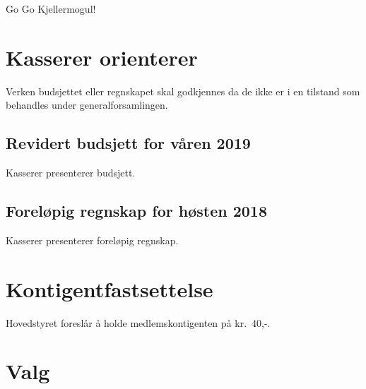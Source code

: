 \documentclass[10pt,norsk,a4paper]{article}
\begin{document}
Go Go Kjellermogul!



\section{Kasserer orienterer}
Verken budsjettet eller regnskapet skal godkjennes da
de ikke er i en tilstand som behandles under generalforsamlingen.

\subsection{Revidert budsjett for våren 2019}
Kasserer presenterer budsjett.

\subsection{Foreløpig regnskap for høsten 2018}
Kasserer presenterer foreløpig regnskap.

\section{Kontigentfastsettelse}
Hovedstyret foreslår å holde medlemskontigenten på kr.~40,-.

\newpage

\section{Valg}
\end{document}
